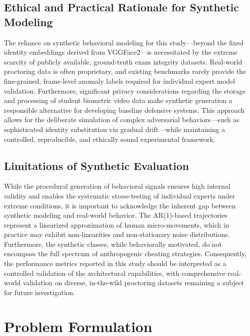 \documentclass[journal]{IEEEtran}
\begin{document}
\subsection{Ethical and Practical Rationale for Synthetic Modeling}

The reliance on synthetic behavioral modeling for this study---beyond the fixed identity embeddings derived from VGGFace2---is necessitated by the extreme scarcity of publicly available, ground-truth exam integrity datasets. Real-world proctoring data is often proprietary, and existing benchmarks rarely provide the fine-grained, frame-level anomaly labels required for individual expert model validation. Furthermore, significant privacy considerations regarding the storage and processing of student biometric video data make synthetic generation a responsible alternative for developing baseline defensive systems. This approach allows for the deliberate simulation of complex adversarial behaviors---such as sophisticated identity substitution via gradual drift---while maintaining a controlled, reproducible, and ethically sound experimental framework.

\subsection{Limitations of Synthetic Evaluation}

While the procedural generation of behavioral signals ensures high internal validity and enables the systematic stress-testing of individual experts under extreme conditions, it is important to acknowledge the inherent gap between synthetic modeling and real-world behavior. The AR(1)-based trajectories represent a linearized approximation of human micro-movements, which in practice may exhibit non-linearities and non-stationary noise distributions. Furthermore, the synthetic classes, while behaviorally motivated, do not encompass the full spectrum of anthropogenic cheating strategies. Consequently, the performance metrics reported in this study should be interpreted as a controlled validation of the architectural capabilities, with comprehensive real-world validation on diverse, in-the-wild proctoring datasets remaining a subject for future investigation.



\section{Problem Formulation}
\label{sec:formulation}
\end{document}
